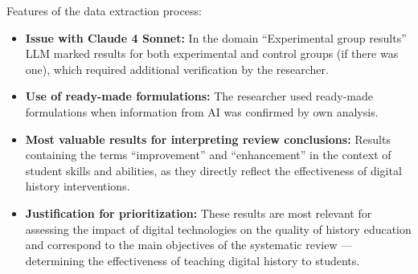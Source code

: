 \documentclass[
hf,
]{ceurart}
\begin{document}
Features of the data extraction process:

\begin{itemize}
    \item 
\textbf{Issue with Claude 4 Sonnet:} In the domain ``Experimental group results'' LLM marked results for both experimental and control groups (if there was one), which required additional verification by the researcher.

    \item 
\textbf{Use of ready-made formulations:} The researcher used ready-made formulations when information from AI was confirmed by own analysis.


    \item 
\textbf{Most valuable results for interpreting review conclusions:} Results containing the terms ``improvement'' and ``enhancement'' in the context of student skills and abilities, as they directly reflect the effectiveness of digital history interventions.

    \item 
\textbf{Justification for prioritization:} These results are most relevant for assessing the impact of digital technologies on the quality of history education and correspond to the main objectives of the systematic review — determining the effectiveness of teaching digital history to students.
\end{itemize}




\end{document}
